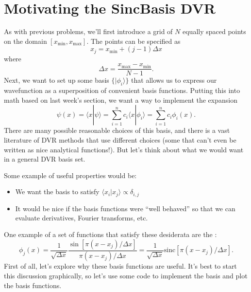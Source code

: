 \documentclass[letterpaper,10pt,english]{jupyterBook}
\begin{document}
\section{Motivating the Sinc\sphinxhyphen{}Basis DVR}
\label{\detokenize{Section4_v2:motivating-the-sinc-basis-dvr}}
\sphinxAtStartPar
As with previous problems, we’ll first introduce a grid of \(N\) equally spaced points on the domain \([x_\text{min}, x_\text{max}]\). The points can be specified as
\label{equation:Section4_v2:79306469-150e-4e09-a1be-5f214872759a}\begin{equation}
x_j = x_\text{min} + (j-1) \Delta x
\end{equation}
\sphinxAtStartPar
where
\label{equation:Section4_v2:2f64238c-4a94-415f-9076-9c61d23dc909}\begin{equation}
\Delta x = \frac{x_\text{max} - x_\text{min}}{N-1}.
\end{equation}
\sphinxAtStartPar
Next, we want to set up some basis \(\{|\phi_i\rangle\}\) that allows us to express our wavefunction as a superposition of convenient basis functions. Putting this into math based on last week’s section, we want a way to implement the expansion
\label{equation:Section4_v2:edc52a9b-18e7-430d-87f3-5bd895fd657c}\begin{equation}
\psi(x) = \langle x | \psi \rangle = \sum_{i=1}^{n} c_i \langle x | \phi_i \rangle = \sum_{i=1}^{n} c_i \phi_i(x).
\end{equation}
\sphinxAtStartPar
There are many possible reasonable choices of this basis, and there is a vast literature of DVR methods that use different choices (some that can’t even be written as nice analytical functions!). But let’s think about what we would want in a general DVR basis set.

\sphinxAtStartPar
{}

\sphinxAtStartPar
{} Some example of useful properties would be:
\begin{itemize}
\item {} 
\sphinxAtStartPar
We want the basis to satisfy \(\langle x_i | x_j \rangle \propto \delta_{i,j}\)

\item {} 
\sphinxAtStartPar
It would be nice if the basis functions were “well behaved” so that we can evaluate derivatives, Fourier transforms, etc.

\end{itemize}

\sphinxAtStartPar
One example of a set of functions that satisfy these desiderata are the :
\label{equation:Section4_v2:db8077b3-8860-453e-8f89-13fa2dbc7c21}\begin{equation}
\phi_j(x) = \frac{1}{\sqrt{\Delta x}} \frac{\sin[\pi (x-x_j)/\Delta x]}{\pi (x-x_j)/\Delta x} = \frac{1}{\sqrt{\Delta x}} \text{sinc} [\pi (x-x_j)/\Delta x].
\end{equation}
\sphinxAtStartPar
First of all, let’s explore why these basis functions are useful. It’s best to start this discussion graphically, so let’s use some code to implement the basis and plot the basis functions.
\end{document}
